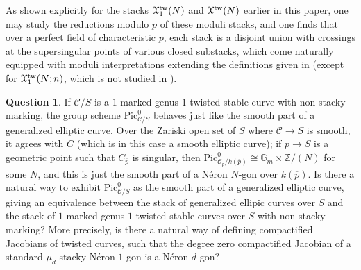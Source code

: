 \documentclass[11pt]{amsart}
\theoremstyle{definition}
\newtheorem{question}[subsection]{Question}
\begin{document}
As shown explicitly for the stacks ${\mathbf{\EuScript{X}}}^{\mathrm{tw}}_1(N)$ and ${\mathbf{\EuScript{X}}}^{\mathrm{tw}}(N)$ earlier in this paper, one may study the reductions modulo $p$ of these moduli stacks, and one finds that over a perfect field of characteristic $p$, each stack is a disjoint union with crossings at the supersingular points of various closed substacks, which come naturally equipped with moduli interpretations extending the definitions given in \cite{KM1} (except for ${\mathbf{\EuScript{X}}}^{\mathrm{tw}}_1(N;n)$, which is not studied in \cite{KM1}).

\begin{question}
If ${\mathcal{C}}/S$ is a $1$-marked genus $1$ twisted stable curve with non-stacky marking, the group scheme $\mathrm{Pic}^0_{{\mathcal{C}}/S}$ behaves just like the smooth part of a generalized elliptic curve. Over the Zariski open set of $S$ where ${\mathcal{C}} \rightarrow S$ is smooth, it agrees with $C$ (which is in this case a smooth elliptic curve); if $\overline{p} \rightarrow S$ is a geometric point such that $C_{\overline{p}}$ is singular, then $\mathrm{Pic}^0_{{\mathcal{C}}_{\overline{p}}/k(\overline{p})} \cong \mathbb{G}_m \times \mathbb{Z}/(N)$ for some $N$, and this is just the smooth part of a N\'eron $N$-gon over $k(\overline{p})$. Is there a natural way to exhibit $\mathrm{Pic}^0_{{\mathcal{C}}/S}$ as the smooth part of a generalized elliptic curve, giving an equivalence between the stack of generalized ellipic curves over $S$ and the stack of $1$-marked genus $1$ twisted stable curves over $S$ with non-stacky marking? More precisely, is there a natural way of defining compactified Jacobians of twisted curves, such that the degree zero compactified Jacobian of a standard $\mu_d$-stacky N\'eron $1$-gon is a N\'eron $d$-gon?
\end{question}
\end{document}
